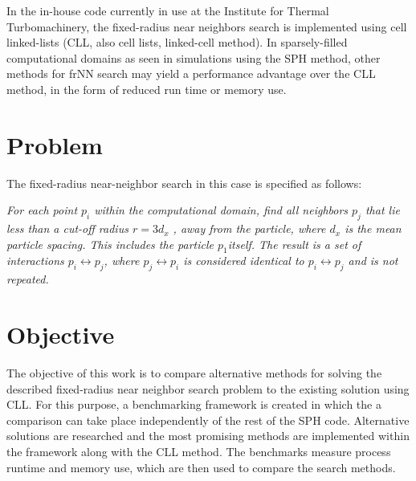 In the in-house code currently in use at the Institute for Thermal Turbomachinery, the fixed-radius near neighbors search is implemented using cell linked-lists (CLL, also cell lists, linked-cell method). In sparsely-filled computational domains as seen in simulations using the SPH method, other methods for frNN search may yield a performance advantage over the CLL method, in the form of reduced run time or memory use.

\section{Problem}
\label{SECTION:Problem}
The fixed-radius near-neighbor search in this case is specified as follows:

{\itshape
For each point $p_i$ within the computational domain, find all neighbors $p_j$ that lie less than a cut-off radius $r = 3d_x$ , away from the particle, where $d_x$ is the mean particle spacing. This includes the particle $p_1$itself. The result is a set of interactions $p_i \leftrightarrow p_j$, where  $p_j \leftrightarrow p_i $ is considered identical to $p_i \leftrightarrow p_j$ and is not repeated.}

\section{Objective}
\label{SECTION:Objective}
The objective of this work is to compare alternative methods for solving the described fixed-radius near neighbor search problem to the existing solution using CLL. For this purpose, a benchmarking framework is created in which the a comparison can take place independently of the rest of the SPH code. Alternative solutions are researched and the most promising methods are implemented within the framework along with the CLL method. The benchmarks measure process runtime and memory use, which are then used to compare the search methods.

